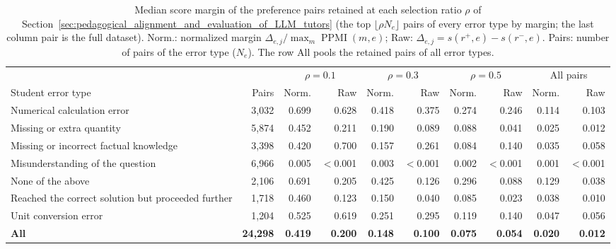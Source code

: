 \begin{table}[!t]
    \centering
    \footnotesize
    \setlength{\tabcolsep}{3.5pt}
    \renewcommand{\arraystretch}{1.08}
    \captionsetup{skip=4pt}
    \begin{tabularx}{\linewidth}{@{}>{\raggedright\arraybackslash}Xrrrrrrrrr@{}}
        \toprule
        & & \multicolumn{2}{c}{$\rho = 0.1$} & \multicolumn{2}{c}{$\rho = 0.3$} & \multicolumn{2}{c}{$\rho = 0.5$} & \multicolumn{2}{c}{All pairs} \\
        \cmidrule(lr){3-4} \cmidrule(lr){5-6} \cmidrule(lr){7-8} \cmidrule(lr){9-10}
        Student error type & Pairs & Norm. & Raw & Norm. & Raw & Norm. & Raw & Norm. & Raw \\
        \midrule
        Numerical calculation error & 3,032 & 0.699 & 0.628 & 0.418 & 0.375 & 0.274 & 0.246 & 0.114 & 0.103 \\
        Missing or extra quantity & 5,874 & 0.452 & 0.211 & 0.190 & 0.089 & 0.088 & 0.041 & 0.025 & 0.012 \\
        Missing or incorrect factual knowledge & 3,398 & 0.420 & 0.700 & 0.157 & 0.261 & 0.084 & 0.140 & 0.035 & 0.058 \\
        Misunderstanding of the question & 6,966 & 0.005 & $<$0.001 & 0.003 & $<$0.001 & 0.002 & $<$0.001 & 0.001 & $<$0.001 \\
        None of the above & 2,106 & 0.691 & 0.205 & 0.425 & 0.126 & 0.296 & 0.088 & 0.129 & 0.038 \\
        Reached the correct solution but proceeded further & 1,718 & 0.460 & 0.123 & 0.150 & 0.040 & 0.085 & 0.023 & 0.038 & 0.010 \\
        Unit conversion error & 1,204 & 0.525 & 0.619 & 0.251 & 0.295 & 0.119 & 0.140 & 0.047 & 0.056 \\
        \midrule
        \textbf{All} & \textbf{24,298} & \textbf{0.419} & \textbf{0.200} & \textbf{0.148} & \textbf{0.100} & \textbf{0.075} & \textbf{0.054} & \textbf{0.020} & \textbf{0.012} \\
        \bottomrule
    \end{tabularx}
    \caption{Median score margin of the preference pairs retained at each selection ratio $\rho$ of Section~\ref{sec:pedagogical_alignment_and_evaluation_of_LLM_tutors} (the top $\lfloor \rho N_e \rfloor$ pairs of every error type by margin; the last column pair is the full dataset). Norm.: normalized margin $\Delta_{e,j}/\max_{m}\operatorname{PPMI}(m,e)$; Raw: $\Delta_{e,j} = s(r^{+}, e) - s(r^{-}, e)$. Pairs: number of pairs of the error type ($N_e$). The row All pools the retained pairs of all error types.}
    \label{tab:margin_by_subset}
\end{table}
